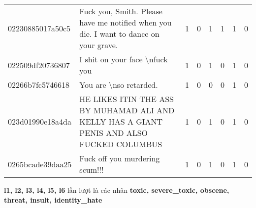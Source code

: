 \begin{sidewaystable}[htb!]
\begin{tabularx}{\textwidth}{L{0.8} L{6.6} C{0.1} C{0.1} C{0.1} C{0.1} C{0.1} C{0.1}}
        02230885017a50c5 & Fuck you, Smith. Please have me notified when you die. I want to dance on your grave.                                            & 1           & 0           & 1           & 1           & 1           & 0           \\
        022509df20736807 & I shit on your face \textbackslash nfuck you                                                                                     & 1           & 0           & 1           & 0           & 1           & 0           \\
        02266b7fc5746618 & You are \textbackslash nso retarded.                                                                                             & 1           & 0           & 0           & 0           & 1           & 0           \\
        023d01990e18a4da & HE LIKES ITIN THE ASS BY MUHAMAD ALI AND KELLY HAS A GIANT PENIS AND ALSO FUCKED COLUMBUS                                        & 1           & 0           & 1           & 0           & 1           & 0           \\
        0265bcade39daa25 & Fuck off you murdering scum!!!                                                                                                   & 1           & 0           & 1           & 0           & 1           & 0           \\
        \bottomrule
    \end{tabularx}
    {
    \fontsize{8pt}{12pt}\selectfont
    \textbf{l1, l2, l3, l4, l5, l6} lần lượt là các nhãn \textbf{toxic, severe\_toxic, obscene, threat, insult, identity\_hate}
    }
\end{sidewaystable}

